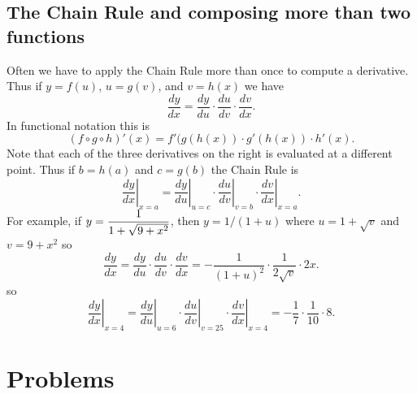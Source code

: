 \subsection{The Chain Rule and composing more than two functions} 
Often we have to apply the Chain Rule more than once to compute a
derivative. Thus if $y=f(u)$, $u=g(v)$, and $v=h(x)$ we have
\[
\frac{dy}{dx}=\frac{dy}{du}\cdot \frac{du}{dv}\cdot \frac{dv}{dx}.
\]
In functional notation this is
\[
(f \circ g\circ h)'(x)=f'(g(h(x))\cdot g'(h(x))\cdot h'(x).
\]
Note that each of the three derivatives on the right is evaluated
at a different point.  Thus if $b=h(a)$ and $c=g(b)$ the Chain
Rule is
\[
\left.\frac{dy}{dx}\right|_{x=a}=
\left.\frac{dy}{du}\right|_{u=c}\cdot
\left.\frac{du}{dv}\right|_{v=b}\cdot
\left.\frac{dv}{dx}\right|_{x=a}.
\]
For example, if $\displaystyle y=\frac1{1+\sqrt{9+x^2}}$, then $y=1/(1+u)$
where $u=1+\sqrt{v}$ and $v=9+x^2$ so
\[
\frac{dy}{dx}=\frac{dy}{du}\cdot \frac{du}{dv}\cdot \frac{dv}{dx}
=-\frac1{(1+u)^2}\cdot\frac1{2\sqrt{v}}\cdot 2x.
\]
so
\[
\left.\frac{dy}{dx}\right|_{x=4}=
\left.\frac{dy}{du}\right|_{u=6}\cdot
\left.\frac{du}{dv}\right|_{v=25}\cdot
\left.\frac{dv}{dx}\right|_{x=4} = - \frac17\cdot\frac1{10}\cdot
8.
\]
















\section{Problems} 
\problemfont 




